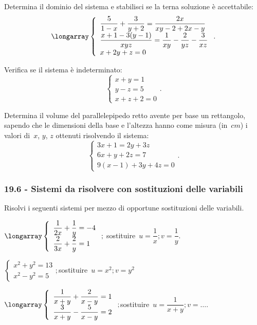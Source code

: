 \begin{esercizio}
 \label{ese:19.63}
Determina il dominio del sistema e stabilisci se la terna soluzione è accettabile:
\[\longarray\left\{\begin{array}{l}\dfrac{5}{1-x}+\dfrac{3}{y+2}=\dfrac{2x}{xy-2+2x-y}\\
\dfrac{x+1-3(y-1)}{xyz}=\dfrac{1}{xy}-\dfrac{2}{yz}-\dfrac{3}{xz}\\
x+2y+z=0\end{array}\right..\]
\end{esercizio}

\begin{esercizio}
 \label{ese:19.64}
Verifica se il sistema è indeterminato:
\[\left\{\begin{array}{l}x+y=1 \\y-z=5
\\x+z+2=0 \end{array}\right..\]
\end{esercizio}

\begin{esercizio}
 \label{ese:19.65}
Determina il volume del parallelepipedo retto avente
per base un rettangolo, sapendo che le dimensioni della base e
l'altezza hanno come misura (in~$\unit{cm}$) i valori
di~$x$, $y$, $z$ ottenuti risolvendo il sistema:
\[\left\{\begin{array}{l}3x+1=2y+3z \\6x+y+2z=7
\\9(x-1)+3y+4z=0 \end{array}\right..\]
\end{esercizio}

\subsubsection*{19.6 - Sistemi da risolvere con sostituzioni delle variabili}

\begin{esercizio}[\Ast]
 \label{ese:19.66}
 Risolvi i seguenti sistemi per mezzo di opportune sostituzioni delle variabili.

\begin{enumeratea}
\item $\longarray\left\{\begin{array}{l}\dfrac{1}{2x}+\dfrac{1}{y}=-4\\\dfrac{2}{3x}+\dfrac{2}{y}=1\end{array}\right.;$ \quad sostituire~$u=\dfrac{1}{x};v=\dfrac{1}{y}$.
\item $\left\{\begin{array}{l}x^{2}+y^{2}=13\\x^{2}-y^{2}=5 \end{array}\right.;$\quad sostituire~$u=x^{2};v=y^{2}$
\item $\longarray\left\{\begin{array}{l}\dfrac{1}{x+y}+\dfrac{2}{x-y}=1\\\dfrac{3}{x+y}-\dfrac{5}{x-y}=2\end{array}\right.;$\quad sostituire~$u=\dfrac{1}{x+y};v=\ldots$.
\end{enumeratea}
\end{esercizio}

